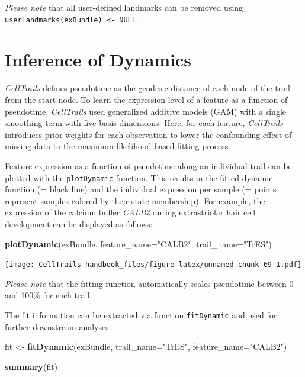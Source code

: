 \documentclass[]{book}
\newenvironment{Shaded}{\begin{snugshade}}{\end{snugshade}}
\newcommand{\KeywordTok}[1]{\textcolor[rgb]{0.13,0.29,0.53}{\textbf{#1}}}
\newcommand{\DataTypeTok}[1]{\textcolor[rgb]{0.13,0.29,0.53}{#1}}
\newcommand{\StringTok}[1]{\textcolor[rgb]{0.31,0.60,0.02}{#1}}
\newcommand{\NormalTok}[1]{#1}
\theoremstyle{definition}
\theoremstyle{definition}
\theoremstyle{definition}
\theoremstyle{remark}
\begin{document}
\emph{Please note} that all user-defined landmarks can be removed using
\texttt{userLandmarks(exBundle)\ \textless{}-\ NULL}.

\section{Inference of Dynamics}\label{inference-of-dynamics}

\emph{CellTrails} defines pseudotime as the geodesic distance of each
node of the trail from the start node. To learn the expression level of
a feature as a function of pseudotime, \emph{CellTrails} used
generalized additive models (GAM) with a single smoothing term with five
basis dimensions. Here, for each feature, \emph{CellTrails} introduces
prior weights for each observation to lower the confounding effect of
missing data to the maximum-likelihood-based fitting process.

Feature expression as a function of pseudotime along an individual trail
can be plotted with the \texttt{plotDynamic} function. This results in
the fitted dynamic function (= black line) and the individual expression
per sample (= points represent samples colored by their state
membership). For example, the expression of the calcium buffer
\emph{CALB2} during extrastriolar hair cell development can be displayed
as follows:

\begin{Shaded}
\begin{Highlighting}[]
\KeywordTok{plotDynamic}\NormalTok{(exBundle, }\DataTypeTok{feature_name=}\StringTok{"CALB2"}\NormalTok{, }\DataTypeTok{trail_name=}\StringTok{"TrES"}\NormalTok{)}
\end{Highlighting}
\end{Shaded}

\texttt{[image: CellTrails-handbook\_files/figure-latex/unnamed-chunk-69-1.pdf]}

\emph{Please note} that the fitting function automatically scales
pseudotime between 0 and 100\% for each trail.

The fit information can be extracted via function \texttt{fitDynamic}
and used for further downstream analyses:

\begin{Shaded}
\begin{Highlighting}[]
\NormalTok{fit <-}\StringTok{ }\KeywordTok{fitDynamic}\NormalTok{(exBundle, }\DataTypeTok{trail_name=}\StringTok{"TrES"}\NormalTok{, }\DataTypeTok{feature_name=}\StringTok{"CALB2"}\NormalTok{)}

\KeywordTok{summary}\NormalTok{(fit)}
\end{Highlighting}
\end{Shaded}
\end{document}
